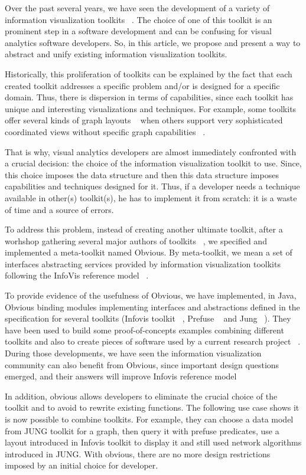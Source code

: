 Over the past several years, we have seen the development of a variety
of information visualization toolkits ~\cite{fekete-uist2003, DBLP:conf/chi/HeerCL05, jung2003, DBLP:conf/infovis/Weaver04}.
The choice of one of this toolkit is an prominent step in a software development and can be confusing
for visual analytics software developers. So, in this article, we propose and present
a way to abstract and unify existing information visualization toolkits.

Historically, this proliferation of toolkits can be explained by the fact
that each created toolkit addresses a specific problem and/or is designed
for a specific domain. Thus, there is dispersion in terms of
capabilities, since each toolkit has unique and interesting visualizations
and techniques. For example, some toolkits offer several kinds of
graph layouts ~\cite{DBLP:conf/infovis/Weaver04} when others support very sophisticated coordinated views
without specific graph capabilities ~\cite{DBLP:conf/chi/HeerCL05}.
 
That is why, visual analytics developers are almost immediately confronted with
a crucial decision: the choice of the information visualization toolkit to use.
Since, this choice imposes the data structure and then this data structure imposes capabilities
and techniques designed for it. Thus, if a developer needs a technique available in other(s)
toolkit(s), he has to implement it from scratch: it is a waste of time and a source of errors.
  
To address this problem, instead of creating another ultimate toolkit, after a worhshop
gathering several major authors of toolkits ~\cite{vismaster2008}, we specified and implemented a meta-toolkit named
Obvious. By meta-toolkit, we mean a set of interfaces abstracting services provided by
information visualization toolkits following the InfoVis reference model ~\cite{DBLP:journals/tvcg/HeerA06a}.
  
To provide evidence of the usefulness of Obvious, we have implemented, in Java, Obvious
binding modules implementing interfaces and abstractions defined in the specification
for several toolkits (Infovis toolkit ~\cite{fekete-uist2003}, Prefuse ~\cite{DBLP:conf/chi/HeerCL05} and Jung ~\cite{jung2003}). They have been used
to build some proof-of-concepts examples combining different toolkits and also to create
pieces of software used by a current research project ~\cite{BENZAKEN:2011:INRIA-00532552:1}. During those developments,
we have seen the information visualization community can also benefit from Obvious, since important design
questions emerged, and their answers will improve Infovis reference model

In addition, obvious allows developers to eliminate the crucial choice of the toolkit and to avoid to rewrite
existing functions. The following use case shows it is now possible to combine toolkits.
For example, they can choose a data model from JUNG toolkit for a graph, then query it with prefuse predicates,
use a layout introduced in Infovis toolkit to display it and still used network algorithms introduced in JUNG.
With obvious, there are no more design restrictions imposed by an initial choice for developer.

